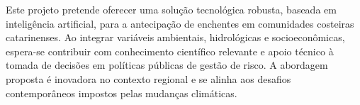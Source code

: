 
Este projeto pretende oferecer uma solução tecnológica robusta, baseada em inteligência artificial, para a antecipação de enchentes em comunidades costeiras catarinenses. Ao integrar variáveis ambientais, hidrológicas e socioeconômicas, espera-se contribuir com conhecimento científico relevante e apoio técnico à tomada de decisões em políticas públicas de gestão de risco. A abordagem proposta é inovadora no contexto regional e se alinha aos desafios contemporâneos impostos pelas mudanças climáticas.
